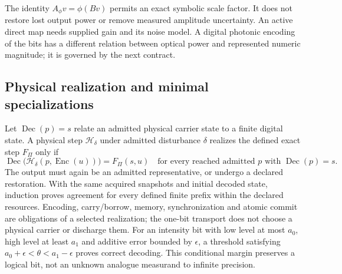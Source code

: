 The identity $A_\phi v=\phi(Bv)$ permits an exact symbolic scale factor. It does
not restore lost output power or remove measured amplitude uncertainty. An
active direct map needs supplied gain and its noise model. A digital photonic
encoding of the bits has a different relation between optical power and
represented numeric magnitude; it is governed by the next contract.

\subsection{Physical realization and minimal specializations}
Let $\operatorname{Dec}(p)=s$ relate an admitted physical carrier state to a
finite digital state. A physical step $\mathcal H_\delta$ under admitted
disturbance $\delta$ realizes the defined exact step $F_\Pi$ only if
\begin{equation}
 \operatorname{Dec}\bigl(\mathcal H_\delta(p,\operatorname{Enc}(u))\bigr)
       =F_\Pi(s,u)
 \quad\text{for every reached admitted }p\text{ with }\operatorname{Dec}(p)=s.
 \label{eq:r14-refinement}
\end{equation}
The output must again be an admitted representative, or undergo a declared
restoration. With the same acquired snapshots and initial decoded state,
induction proves agreement for every defined finite prefix within the declared
resources. Encoding, carry/borrow, memory, synchronization and atomic commit
are obligations of a selected realization; the one-bit transport does not
choose a physical carrier or discharge them. For an intensity bit with low
level at most $a_0$, high level at least $a_1$ and additive error bounded by
$\epsilon$, a threshold satisfying $a_0+\epsilon<\theta<a_1-\epsilon$ proves
correct decoding. This conditional margin preserves a logical bit, not an
unknown analogue measurand to infinite precision.

